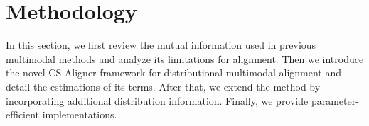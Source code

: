 


\section{Methodology}
\label{sec:method}



In this section, we first review the mutual information used in previous multimodal methods and analyze its limitations for alignment.
Then we introduce the novel CS-Aligner framework for distributional multimodal alignment and detail the estimations of its terms.
After that, we extend the method by incorporating additional distribution information.
Finally, we provide parameter-efficient implementations.


